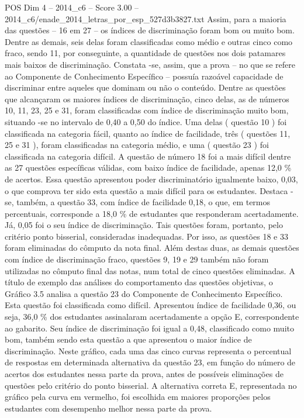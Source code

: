 \begin{textsample}{POS Dim 4 – 2014\_c6 – Score 3.00 – 2014\_c6/enade\_2014\_letras\_por\_esp\_527d3b3827.txt}
Assim, para a maioria das questões – 16 em 27 – os índices de discriminação foram bom ou muito bom.
Dentre as demais, seis delas foram classificadas como médio e outras cinco como fraco, sendo 11, por conseguinte, a quantidade de questões nos dois patamares mais baixos de discriminação.
Constata -se, assim, que a prova – no que se refere ao Componente de Conhecimento Específico – possuía razoável capacidade de discriminar entre aqueles que dominam ou não o conteúdo.
Dentre as questões que alcançaram os maiores índices de discriminação, cinco delas, as de números 10, 11, 23, 25 e 31, foram classificadas com índice de discriminação muito bom, situando -se no intervalo de 0,40 a 0,50 do índice.
Uma delas ( questão 10 ) foi classificada na categoria fácil, quanto ao índice de facilidade, três ( questões 11, 25 e 31 ), foram classificadas na categoria médio, e uma ( questão 23 ) foi classificada na categoria difícil.
A questão de número 18 foi a mais difícil dentre as 27 questões específicas válidas, com baixo índice de facilidade, apenas 12,0 \% de acertos.
Essa questão apresentou poder discriminatório igualmente baixo, 0,03, o que comprova ter sido esta questão a mais difícil para os estudantes.
Destaca -se, também, a questão 33, com índice de facilidade 0,18, o que, em termos percentuais, corresponde a 18,0 \% de estudantes que responderam acertadamente.
Já, 0,05 foi o seu índice de discriminação.
Tais questões foram, portanto, pelo critério ponto bisserial, consideradas inadequadas.
Por isso, as questões 18 e 33 foram eliminadas do cômputo da nota final.
Além destas duas, as demais questões com índice de discriminação fraco, questões 9, 19 e 29 também não foram utilizadas no cômputo final das notas, num total de cinco questões eliminadas.
A título de exemplo das análises do comportamento das questões objetivas, o Gráfico 3.5 analisa a questão 23 do Componente de Conhecimento Específico.
Esta questão foi classificada como difícil.
Apresentou índice de facilidade 0,36, ou seja, 36,0 \% dos estudantes assinalaram acertadamente a opção E, correspondente ao gabarito.
Seu índice de discriminação foi igual a 0,48, classificado como muito bom, também sendo esta questão a que apresentou o maior índice de discriminação.
Neste gráfico, cada uma das cinco curvas representa o percentual de respostas em determinada alternativa da questão 23, em função do número de acertos dos estudantes nessa parte da prova, antes de possíveis eliminações de questões pelo critério do ponto bisserial.
A alternativa correta E, representada no gráfico pela curva em vermelho, foi escolhida em maiores proporções pelos estudantes com desempenho melhor nessa parte da prova.

\end{textsample}
